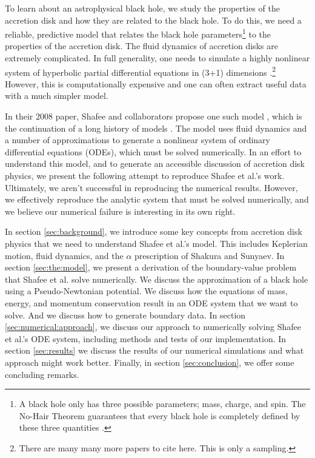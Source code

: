 \documentclass[]{article}
\begin{document}
To learn about an astrophysical black hole, we study the properties of
the accretion disk and how they are related to the black hole. To do
this, we need a reliable, predictive model that relates the black hole
parameters\footnote{A black hole only has three possible parameters;
  mass, charge, and spin. The No-Hair Theorem guarantees that every
  black hole is completely defined by these three quantities
  \cite{MisnerThorneWheeler}.} to the properties of the accretion
disk. The fluid dynamics of accretion disks are extremely
complicated. In full generality, one needs to simulate a highly
nonlinear system of hyperbolic partial differential equations in (3+1)
dimensions \cite{LehnerReview01, Ott08,Font08,
  BucciantiniZanna13}.\footnote{There are many many more papers to
  cite here. This is only a sampling.} However, this is
computationally expensive and one can often extract useful data with a
much simpler model.

In their 2008 paper, Shafee and collaborators propose one such model
\cite{Shafee08}, which is the continuation of a long history of models
\cite{PBK81,MuchotrzebPaczynski82,Kato88a,Abramowicz88,PophamNarayan91,NarayanPopham93,ChenTaam93,NarayanYi94,Narayan97,Chen97,AfshordiPaczynski03}. The
model uses fluid dynamics and a number of approximations to generate a
nonlinear system of ordinary differential equations (ODEs), which must be
solved numerically. In an effort to understand this model, and to
generate an accessible discussion of accretion disk physics, we
present the following attempt to reproduce Shafee et al.'s
work. Ultimately, we aren't successful in reproducing the numerical
results. However, we effectively reproduce the analytic system that
must be solved numerically, and we believe our numerical failure is
interesting in its own right.

In section \ref{sec:background}, we introduce some key concepts from
accretion disk physics that we need to understand Shafee et al.'s
model. This includes Keplerian motion, fluid dynamics, and the
$\alpha$ prescription of Shakura and Sunyaev. In section
\ref{sec:the:model}, we present a derivation of the boundary-value
problem that Shafee et al. solve numerically. We discuss the
approximation of a black hole using a Pseudo-Newtonian potential. We
discuss how the equations of mass, energy, and momentum conservation
result in an ODE system that we want to solve. And we discuss how to
generate boundary data. In section \ref{sec:numerical:approach}, we
discuss our approach to numerically solving Shafee et al.'s ODE
system, including methods and tests of our implementation. In section
\ref{sec:results} we discuss the results of our numerical simulations
and what approach might work better. Finally, in section
\ref{sec:conclusion}, we offer some concluding remarks.
\end{document}
